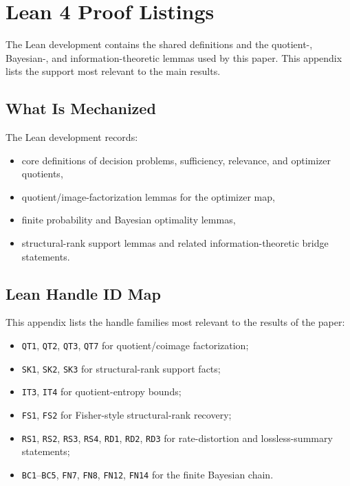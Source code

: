\section{Lean 4 Proof Listings}\label{app:lean}

The Lean development contains the shared definitions and the quotient-, Bayesian-, and information-theoretic lemmas used by this paper. This appendix lists the support most relevant to the main results.

\subsection{What Is Mechanized}

The Lean development records:
\begin{itemize}
\item core definitions of decision problems, sufficiency, relevance, and optimizer quotients,
\item quotient/image-factorization lemmas for the optimizer map,
\item finite probability and Bayesian optimality lemmas,
\item structural-rank support lemmas and related information-theoretic bridge statements.
\end{itemize}

\subsection{Lean Handle ID Map}\label{sec:lean-handle-id-map}
This appendix lists the handle families most relevant to the results of the paper:
\begin{itemize}
\item \texttt{QT1}, \texttt{QT2}, \texttt{QT3}, \texttt{QT7} for quotient/coimage factorization;
\item \texttt{SK1}, \texttt{SK2}, \texttt{SK3} for structural-rank support facts;
\item \texttt{IT3}, \texttt{IT4} for quotient-entropy bounds;
\item \texttt{FS1}, \texttt{FS2} for Fisher-style structural-rank recovery;
\item \texttt{RS1}, \texttt{RS2}, \texttt{RS3}, \texttt{RS4}, \texttt{RD1}, \texttt{RD2}, \texttt{RD3} for rate-distortion and lossless-summary statements;
\item \texttt{BC1}--\texttt{BC5}, \texttt{FN7}, \texttt{FN8}, \texttt{FN12}, \texttt{FN14} for the finite Bayesian chain.
\end{itemize}

